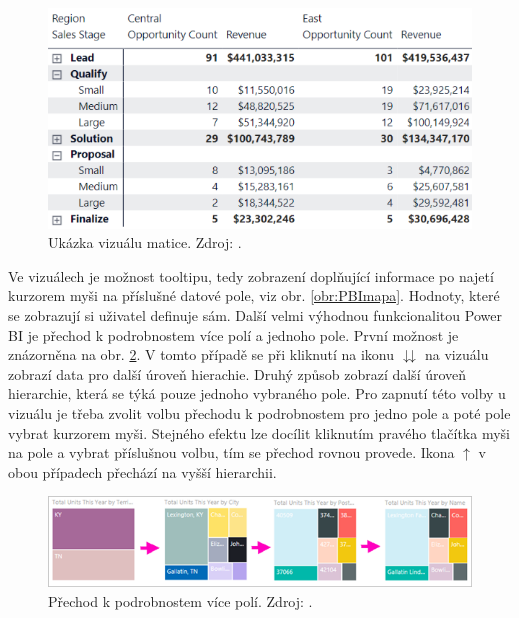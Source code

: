 \begin{figure}[hbtp!]
\begin{minipage}{.4\textwidth}
        \includegraphics[width=\textwidth]{obrazky/PBIteorie/power-bi-expansion-state.png}
        \caption{Ukázka vizuálu matice. Zdroj: \cite{bib:PBI}.}
        \label{obr:PBItab.}
    \end{minipage}
\end{figure}

Ve vizuálech je možnost tooltipu, tedy zobrazení doplňující informace po najetí kurzorem myši na příslušné datové pole, viz obr. \ref*{obr:PBImapa}. Hodnoty, které se zobrazují si uživatel definuje sám. Další velmi výhodnou funkcionalitou Power BI je přechod k podrobnostem více polí a jednoho pole. První možnost je znázorněna na obr.     \ref*{obr:PBIdrillall}. V tomto případě se při kliknutí na ikonu $\downdownarrows$ na vizuálu zobrazí data pro další úroveň hierachie. Druhý způsob zobrazí další úroveň hierarchie, která se týká pouze jednoho vybraného pole. Pro zapnutí této volby u vizuálu je třeba zvolit volbu přechodu k podrobnostem pro jedno pole a poté pole vybrat kurzorem myši. Stejného efektu lze docílit kliknutím pravého tlačítka myši na pole a vybrat příslušnou volbu, tím se přechod rovnou provede. Ikona $\uparrow$ v obou případech přechází na vyšší hierarchii.

\begin{figure}[h!]
    \centering
    \captionsetup{justification=centering}
    \includegraphics[width=.9\textwidth]{obrazky/PBIteorie/power-bi-drill-path.png}
    \caption{Přechod k podrobnostem více polí. 
    Zdroj: \cite{bib:PBI}.}
    \label{obr:PBIdrillall}
\end{figure}

